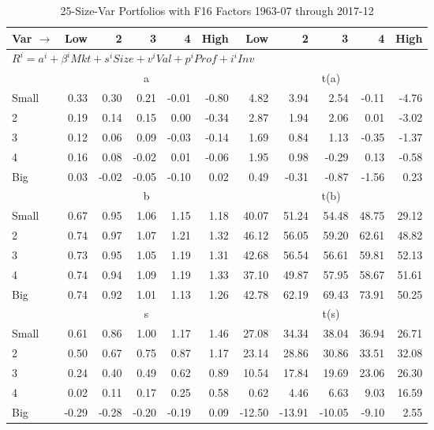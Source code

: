 
\begin{table}[!ht]
\footnotesize
\centering
\caption{25-Size-Var Portfolios with F16 Factors 1963-07 through 2017-12}
\begin{tabular}{lrrrrrrrrrr}
  \toprule
    
    Var $\rightarrow$ & Low & 2 & 3 & 4 & High & Low & 2 & 3 & 4 & High  \\ 
  \midrule
  \multicolumn{11}{l}{$R^i=a^i+\beta^iMkt+s^iSize+v^iVal+p^iProf+i^iInv$}  \\
  
     & \multicolumn{5}{c}{a} & \multicolumn{5}{c}{t(a)}   \\
     \cmidrule(r){2-6} \cmidrule(r){7-11} 
    Small  & 0.33  & 0.30  & 0.21  & -0.01  & -0.80  & 4.82  & 3.94  & 2.54  & -0.11  & -4.76   \\
    2  & 0.19  & 0.14  & 0.15  & 0.00  & -0.34  & 2.87  & 1.94  & 2.06  & 0.01  & -3.02   \\
    3  & 0.12  & 0.06  & 0.09  & -0.03  & -0.14  & 1.69  & 0.84  & 1.13  & -0.35  & -1.37   \\
    4  & 0.16  & 0.08  & -0.02  & 0.01  & -0.06  & 1.95  & 0.98  & -0.29  & 0.13  & -0.58   \\
    Big  & 0.03  & -0.02  & -0.05  & -0.10  & 0.02  & 0.49  & -0.31  & -0.87  & -1.56  & 0.23   \\
    
  
     & \multicolumn{5}{c}{b} & \multicolumn{5}{c}{t(b)}   \\
     \cmidrule(r){2-6} \cmidrule(r){7-11} 
    Small  & 0.67  & 0.95  & 1.06  & 1.15  & 1.18  & 40.07  & 51.24  & 54.48  & 48.75  & 29.12   \\
    2  & 0.74  & 0.97  & 1.07  & 1.21  & 1.32  & 46.12  & 56.05  & 59.20  & 62.61  & 48.82   \\
    3  & 0.73  & 0.95  & 1.05  & 1.19  & 1.31  & 42.68  & 56.54  & 56.61  & 59.81  & 52.13   \\
    4  & 0.74  & 0.94  & 1.09  & 1.19  & 1.33  & 37.10  & 49.87  & 57.95  & 58.67  & 51.61   \\
    Big  & 0.74  & 0.92  & 1.01  & 1.13  & 1.26  & 42.78  & 62.19  & 69.43  & 73.91  & 50.25   \\
    
  
     & \multicolumn{5}{c}{s} & \multicolumn{5}{c}{t(s)}   \\
     \cmidrule(r){2-6} \cmidrule(r){7-11} 
    Small  & 0.61  & 0.86  & 1.00  & 1.17  & 1.46  & 27.08  & 34.34  & 38.04  & 36.94  & 26.71   \\
    2  & 0.50  & 0.67  & 0.75  & 0.87  & 1.17  & 23.14  & 28.86  & 30.86  & 33.51  & 32.08   \\
    3  & 0.24  & 0.40  & 0.49  & 0.62  & 0.89  & 10.54  & 17.84  & 19.69  & 23.06  & 26.30   \\
    4  & 0.02  & 0.11  & 0.17  & 0.25  & 0.58  & 0.62  & 4.46  & 6.63  & 9.03  & 16.59   \\
    Big  & -0.29  & -0.28  & -0.20  & -0.19  & 0.09  & -12.50  & -13.91  & -10.05  & -9.10  & 2.55   \\
    

\end{tabular}
\end{table}
